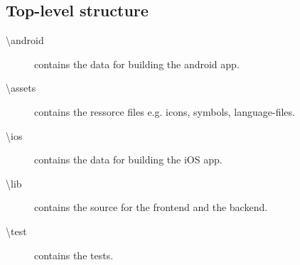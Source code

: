 %
\newcommand{\FTdir}{}
\def\FTdir(#1,#2,#3){%
    \FTfile(#1,{{\color{black!40!white}\faFolderOpen}\hspace{0.2em}#3})
    (tmp.west)++(0.8em,-0.4em)node(#2){}
    (tmp.west)++(1.5em,0)
    ++(0,-1.3em) 
}

\newcommand{\FTfile}{}
\def\FTfile(#1,#2){%
    node(tmp){}
    (#1|-tmp)++(0.6em,0)
    node(tmp)[anchor=west,black]{\ttfamily #2}
    (#1)|-(tmp.west)
    ++(0,-1.2em) 
}

\newcommand{\FTroot}{}
\def\FTroot{tmp.west}

\subsection{Top-level structure}
\label{fig: structure-toplevel}

\begin{description}
    \item[\textbackslash android] contains the data for building the android app.
    \item[\textbackslash assets] contains the ressorce files e.g. icons, symbols, language-files.
    \item[\textbackslash ios] contains the data for building the iOS app.
    \item[\textbackslash lib] contains the source for the frontend and the backend.
    \item[\textbackslash test] contains the tests.
\end{description}

